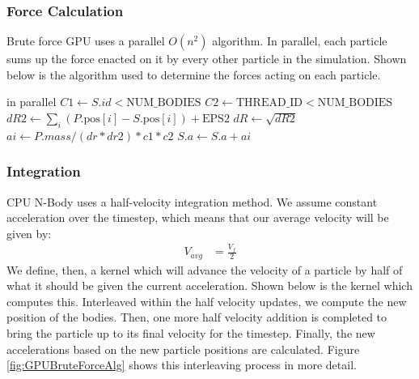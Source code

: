 \documentclass{thesis}
\begin{document}
\subsubsection{Force Calculation}
Brute force GPU uses a parallel $O(n^2)$ algorithm. In parallel, each particle sums up the force enacted on it by every other particle in the simulation. Shown below is the algorithm used to determine the forces acting on each particle.
\begin{algorithmic}
     in parallel
            \State $C1 \gets S.id < \text{NUM\_BODIES}$
            \State $C2 \gets \text{THREAD\_ID} < \text{NUM\_BODIES}$
            \State $dR2 \gets \sum_i (P.\text{pos}[i] - S.\text{pos}[i]) + \text{EPS2}$
            \State $dR \gets \sqrt{dR2}$
            \State $ai \gets P.mass/(dr*dr2) * c1 * c2$
            \State $S.a \gets S.a + ai$ 
        \EndFor
    \EndFor
\end{algorithmic}
\subsubsection{Integration}
CPU N-Body uses a half-velocity integration method. We assume constant acceleration over the timestep, which means that our average velocity will be given by:
\begin{align}
    V_{avg} &= \frac{V_f}{2}
\end{align}
We define, then, a kernel which will advance the velocity of a particle by half of what it should be given the current acceleration. Shown below is the kernel which computes this.
Interleaved within the half velocity updates, we compute the new position of the bodies. Then, one more half velocity addition is completed to bring the particle up to its final velocity for the timestep. Finally, the new accelerations based on the new particle positions are calculated. Figure \ref{fig:GPUBruteForceAlg} shows this interleaving process in more detail.
\end{document}
